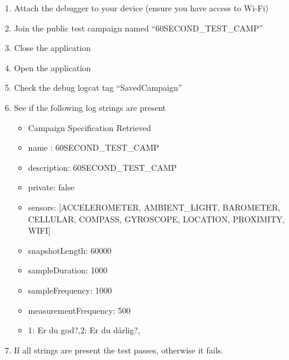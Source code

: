 \begin{enumerate}
    \item Attach the debugger to your device (ensure you have access to Wi-Fi)
    \item Join the public test campaign named ``60SECOND\_TEST\_CAMP''
    \item Close the application
    \item Open the application
    \item Check the debug logcat tag ``SavedCampaign''
    \item See if the following log strings are present
        \begin{itemize}
            \item Campaign Specification Retrieved
            \item name : 60SECOND\_TEST\_CAMP
            \item description: 60SECOND\_TEST\_CAMP
            \item private: false
            \item sensors: [ACCELEROMETER, AMBIENT\_LIGHT, BAROMETER, CELLULAR, COMPASS, GYROSCOPE, LOCATION, PROXIMITY, WIFI]
            \item snapshotLength: 60000
            \item sampleDuration: 1000
            \item sampleFrequency: 1000
            \item measurementFrequency: 500
            \item 1: Er du god?,2: Er du dårlig?,
        \end{itemize}
    \item If all strings are present the test passes, otherwise it fails.
\end{enumerate}


